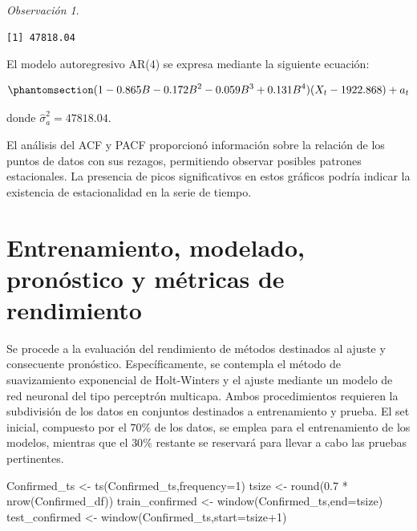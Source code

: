 \documentclass[
  us-letterpaper,
]{scrreprt}
\newenvironment{Shaded}{\begin{snugshade}}{\end{snugshade}}
\newcommand{\AttributeTok}[1]{\textcolor[rgb]{0.40,0.45,0.13}{#1}}
\newcommand{\CommentTok}[1]{\textcolor[rgb]{0.37,0.37,0.37}{#1}}
\newcommand{\DecValTok}[1]{\textcolor[rgb]{0.68,0.00,0.00}{#1}}
\newcommand{\FloatTok}[1]{\textcolor[rgb]{0.68,0.00,0.00}{#1}}
\newcommand{\FunctionTok}[1]{\textcolor[rgb]{0.28,0.35,0.67}{#1}}
\newcommand{\NormalTok}[1]{\textcolor[rgb]{0.00,0.23,0.31}{#1}}
\newcommand{\OtherTok}[1]{\textcolor[rgb]{0.00,0.23,0.31}{#1}}
\newcommand{\SpecialCharTok}[1]{\textcolor[rgb]{0.37,0.37,0.37}{#1}}
\theoremstyle{definition}
\theoremstyle{plain}
\theoremstyle{plain}
\theoremstyle{definition}
\theoremstyle{remark}
\newtheorem*{remark}{Observación}
\begin{document}
\begin{remark}
\begin{Shaded}
\end{Shaded}

\begin{verbatim}
[1] 47818.04
\end{verbatim}

El modelo autoregresivo AR(4) se expresa mediante la siguiente ecuación:

\begin{equation}\phantomsection\label{eq-AR4}{
(1-0.865B-0.172B^2-0.059B^3+0.131B^4)(X_t-1922.868)+a_t
}\end{equation}

donde \(\hat{\sigma}_a^2 = 47818.04\).
\end{remark}

El análisis del ACF y PACF proporcionó información sobre la relación de
los puntos de datos con sus rezagos, permitiendo observar posibles
patrones estacionales. La presencia de picos significativos en estos
gráficos podría indicar la existencia de estacionalidad en la serie de
tiempo.

\section{Entrenamiento, modelado, pronóstico y métricas de
rendimiento}\label{entrenamiento-modelado-pronuxf3stico-y-muxe9tricas-de-rendimiento}

Se procede a la evaluación del rendimiento de métodos destinados al
ajuste y consecuente pronóstico. Específicamente, se contempla el método
de suavizamiento exponencial de Holt-Winters y el ajuste mediante un
modelo de red neuronal del tipo perceptrón multicapa. Ambos
procedimientos requieren la subdivisión de los datos en conjuntos
destinados a entrenamiento y prueba. El set inicial, compuesto por el
\(70\%\) de los datos, se emplea para el entrenamiento de los modelos,
mientras que el \(30\%\) restante se reservará para llevar a cabo las
pruebas pertinentes.

\begin{Shaded}
\begin{Highlighting}[]
\NormalTok{Confirmed\_ts }\OtherTok{\textless{}{-}} \FunctionTok{ts}\NormalTok{(Confirmed\_ts,}\AttributeTok{frequency=}\DecValTok{1}\NormalTok{)}
\NormalTok{tsize }\OtherTok{\textless{}{-}} \FunctionTok{round}\NormalTok{(}\FloatTok{0.7} \SpecialCharTok{*} \FunctionTok{nrow}\NormalTok{(Confirmed\_df))}
\NormalTok{train\_confirmed }\OtherTok{\textless{}{-}} \FunctionTok{window}\NormalTok{(Confirmed\_ts,}\AttributeTok{end=}\NormalTok{tsize)}
\NormalTok{test\_confirmed }\OtherTok{\textless{}{-}} \FunctionTok{window}\NormalTok{(Confirmed\_ts,}\AttributeTok{start=}\NormalTok{tsize}\SpecialCharTok{+}\DecValTok{1}\NormalTok{)}
\end{Highlighting}
\end{Shaded}
\end{document}
